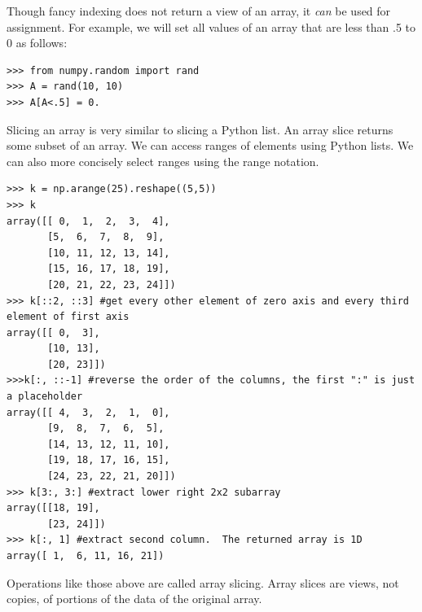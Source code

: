 Though fancy indexing does not return a view of an array, it \emph{can} be used for assignment.
For example, we will set all values of an array that are less than .5 to 0 as follows:
\begin{lstlisting}
>>> from numpy.random import rand
>>> A = rand(10, 10)
>>> A[A<.5] = 0.
\end{lstlisting}

Slicing an array is very similar to slicing a Python list.
An array slice returns some subset of an array.
We can access ranges of elements using Python lists.
We can also more concisely select ranges using the  range notation.
\begin{lstlisting}
>>> k = np.arange(25).reshape((5,5))
>>> k
array([[ 0,  1,  2,  3,  4],
       [5,  6,  7,  8,  9],
       [10, 11, 12, 13, 14],
       [15, 16, 17, 18, 19],
       [20, 21, 22, 23, 24]])
>>> k[::2, ::3] #get every other element of zero axis and every third element of first axis
array([[ 0,  3],
       [10, 13],
       [20, 23]])
>>>k[:, ::-1] #reverse the order of the columns, the first ":" is just a placeholder
array([[ 4,  3,  2,  1,  0],
       [9,  8,  7,  6,  5],
       [14, 13, 12, 11, 10],
       [19, 18, 17, 16, 15],
       [24, 23, 22, 21, 20]])
>>> k[3:, 3:] #extract lower right 2x2 subarray
array([[18, 19],
       [23, 24]])
>>> k[:, 1] #extract second column.  The returned array is 1D
array([ 1,  6, 11, 16, 21])
\end{lstlisting}
Operations like those above are called array slicing.
Array slices are views, not copies, of portions of the data of the original array.



